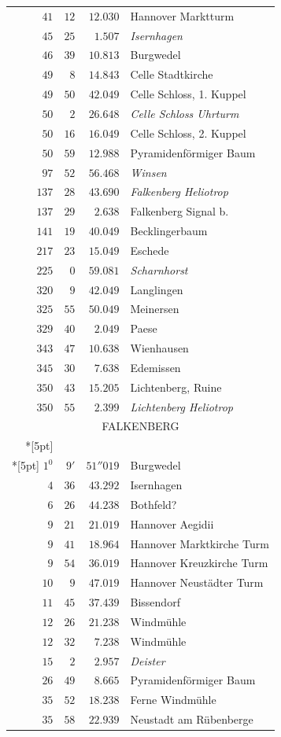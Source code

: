 \begin{longtable}{@{}rrrp{.61\linewidth}@{}}
\(41\)&\(12\)&\(12.030\)&\raggedright Hannover Marktturm\tabularnewline
\(45\)&\(25\)&\(1.507\)&\raggedright \textit{Isernhagen}\tabularnewline
\(46\)&\(39\)&\(10.813\)&\raggedright Burgwedel\tabularnewline
\(49\)&\(8\)&\(14.843\)&\raggedright Celle Stadtkirche\tabularnewline
\(49\)&\(50\)&\(42.049\)&\raggedright Celle Schloss, 1. Kuppel\tabularnewline
\(50\)&\(2\)&\(26.648\)&\raggedright \textit{Celle Schloss Uhrturm}\tabularnewline
\(50\)&\(16\)&\(16.049\)&\raggedright Celle Schloss, 2. Kuppel\tabularnewline
\(50\)&\(59\)&\(12.988\)&\raggedright Pyramidenförmiger Baum\tabularnewline
\(97\)&\(52\)&\(56.468\)&\raggedright \textit{Winsen}\tabularnewline
\(137\)&\(28\)&\(43.690\)&\raggedright \textit{Falkenberg Heliotrop}\tabularnewline
\(137\)&\(29\)&\(2.638\)&\raggedright Falkenberg Signal b.\tabularnewline
\(141\)&\(19\)&\(40.049\)&\raggedright Becklingerbaum\tabularnewline
\(217\)&\(23\)&\(15.049\)&\raggedright Eschede\tabularnewline
\(225\)&\(0\)&\(59.081\)&\raggedright \textit{Scharnhorst}\tabularnewline
\(320\)&\(9\)&\(42.049\)&\raggedright Langlingen\tabularnewline
\(325\)&\(55\)&\(50.049\)&\raggedright Meinersen\tabularnewline
\(329\)&\(40\)&\(2.049\)&\raggedright Paese\tabularnewline
\(343\)&\(47\)&\(10.638\)&\raggedright Wienhausen\tabularnewline
\(345\)&\(30\)&\(7.638\)&\raggedright Edemissen\tabularnewline
\(350\)&\(43\)&\(15.205\)&\raggedright Lichtenberg, Ruine\tabularnewline
\(350\)&\(55\)&\(2.399\)&\raggedright \textit{Lichtenberg Heliotrop}\tabularnewline
\multicolumn{4}{c}{\strut FALKENBERG}\\*[5pt]
\multicolumn{4}{c}{\(-146621.040\)\qquad\(+5142.567\)}\\*[5pt]
\(1^{0}\)&\(9'\)&\(51''019\)&\raggedright Burgwedel\tabularnewline
\(4\)&\(36\)&\(43.292\)&\raggedright Isernhagen\tabularnewline
\(6\)&\(26\)&\(44.238\)&\raggedright Bothfeld?\tabularnewline
\(9\)&\(21\)&\(21.019\)&\raggedright Hannover Aegidii\tabularnewline
\(9\)&\(41\)&\(18.964\)&\raggedright Hannover Marktkirche Turm\tabularnewline
\(9\)&\(54\)&\(36.019\)&\raggedright Hannover Kreuzkirche Turm\tabularnewline
\(10\)&\(9\)&\(47.019\)&\raggedright Hannover Neustädter Turm\tabularnewline
\(11\)&\(45\)&\(37.439\)&\raggedright Bissendorf\tabularnewline
\(12\)&\(26\)&\(21.238\)&\raggedright Windmühle\tabularnewline
\(12\)&\(32\)&\(7.238\)&\raggedright Windmühle\tabularnewline
\(15\)&\(2\)&\(2.957\)&\raggedright \textit{Deister}\tabularnewline
\(26\)&\(49\)&\(8.665\)&\raggedright Pyramidenförmiger Baum\tabularnewline
\(35\)&\(52\)&\(18.238\)&\raggedright Ferne Windmühle\tabularnewline
\(35\)&\(58\)&\(22.939\)&\raggedright Neustadt am Rübenberge\tabularnewline

\end{longtable}
